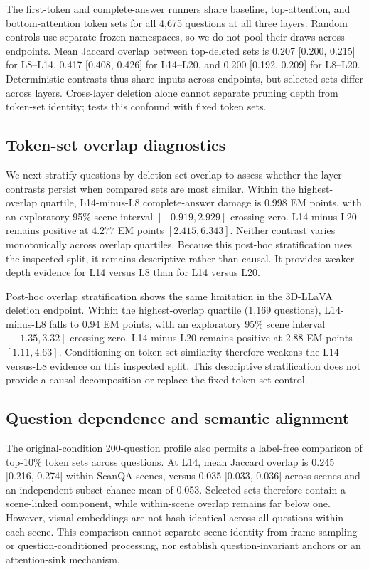 The first-token and complete-answer runners share baseline, top-attention, and bottom-attention token sets for all 4,675 questions at all three layers. Random controls use separate frozen namespaces, so we do not pool their draws across endpoints. Mean Jaccard overlap between top-deleted sets is 0.207 [0.200, 0.215] for L8--L14, 0.417 [0.408, 0.426] for L14--L20, and 0.200 [0.192, 0.209] for L8--L20. Deterministic contrasts thus share inputs across endpoints, but selected sets differ across layers. Cross-layer deletion alone cannot separate pruning depth from token-set identity;  tests this confound with fixed token sets.

\subsection{Token-set overlap diagnostics}
We next stratify questions by deletion-set overlap to assess whether the layer contrasts persist when compared sets are most similar. Within the highest-overlap quartile, L14-minus-L8 complete-answer damage is $0.998$ EM points, with an exploratory 95\% scene interval $[-0.919,2.929]$ crossing zero. L14-minus-L20 remains positive at $4.277$ EM points $[2.415,6.343]$. Neither contrast varies monotonically across overlap quartiles. Because this post-hoc stratification uses the inspected split, it remains descriptive rather than causal. It provides weaker depth evidence for L14 versus L8 than for L14 versus L20.

Post-hoc overlap stratification shows the same limitation in the 3D-LLaVA deletion endpoint. Within the highest-overlap quartile (1,169 questions), L14-minus-L8 falls to 0.94 EM points, with an exploratory 95\% scene interval $[-1.35,3.32]$ crossing zero. L14-minus-L20 remains positive at 2.88 EM points $[1.11,4.63]$. Conditioning on token-set similarity therefore weakens the L14-versus-L8 evidence on this inspected split. This descriptive stratification does not provide a causal decomposition or replace the fixed-token-set control.

\subsection{Question dependence and semantic alignment}
The original-condition 200-question profile also permits a label-free comparison of top-10\% token sets across questions. At L14, mean Jaccard overlap is 0.245 [0.216, 0.274] within ScanQA scenes, versus 0.035 [0.033, 0.036] across scenes and an independent-subset chance mean of 0.053. Selected sets therefore contain a scene-linked component, while within-scene overlap remains far below one. However, visual embeddings are not hash-identical across all questions within each scene. This comparison cannot separate scene identity from frame sampling or question-conditioned processing, nor establish question-invariant anchors or an attention-sink mechanism.

